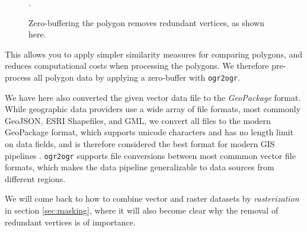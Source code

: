 \begin{figure}[H]
  \centering
  
  \caption{Zero-buffering the polygon removes redundant vertices, as shown here.}
  \label{fig:redundant-zero-buffer}.
\end{figure}

This allows you to apply simpler similarity measures for comparing polygons, and reduces computational costs when processing the polygons.
We therefore pre-process all polygon data by applying a zero-buffer with \texttt{ogr2ogr}.


We have here also converted the given vector data file to the \textit{GeoPackage} format.
While geographic data providers use a wide array of file formats, most commonly GeoJSON, ESRI Shapefiles, and GML, we convert all files to the modern GeoPackage format, which supports unicode characters and has no length limit on data fields, and is therefore considered the best format for modern GIS pipelines \cite{hame_shapefile_2019}.
\texttt{ogr2ogr} supports file conversions between most commmon vector file formats, which makes the data pipeline generalizable to data sources from different regions.

We will come back to how to combine vector and raster datasets by \textit{rasterization} in section \ref{sec:masking}, where it will also become clear why the removal of redundant vertices is of importance.
